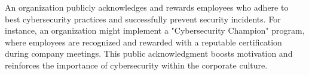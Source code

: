 An organization publicly acknowledges and rewards employees who adhere to best cybersecurity practices and successfully prevent security incidents. For instance, an organization might implement a "Cybersecurity Champion" program, where employees are recognized and rewarded with a reputable certification during company meetings. This public acknowledgment boosts motivation and reinforces the importance of cybersecurity within the corporate culture.